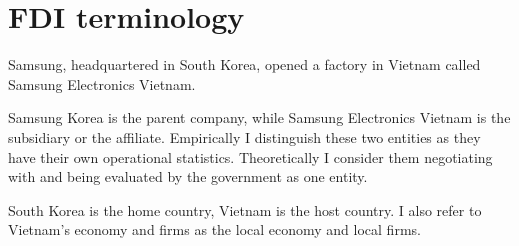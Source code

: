 \chapter{FDI terminology}

Samsung, headquartered in South Korea, opened a factory in Vietnam called
Samsung Electronics Vietnam.

Samsung Korea is the parent company, while Samsung Electronics Vietnam is the
subsidiary or the affiliate. Empirically I distinguish these two entities as they
have their own operational statistics. Theoretically I consider them negotiating
with and being evaluated by the government as one entity.

South Korea is the home country, Vietnam is the host country. I also refer to
Vietnam's economy and firms as the local economy and local firms.